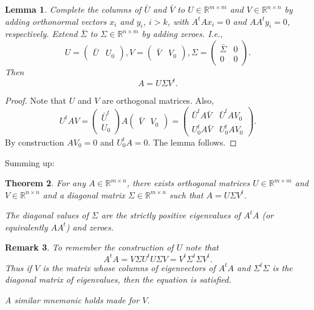 \documentclass{article}
\newtheorem{theorem}{Theorem}
\newtheorem{lemma}[theorem]{Lemma}
\newtheorem{remark}[theorem]{Remark}
\newcommand{\trans}{t}
\begin{document}
\begin{lemma}
Complete the columns of $\bar{U}$ and $\bar{V}$ to $U \in \mathbb{R}^{m \times m}$ and $V \in \mathbb{R}^{n \times n}$ by adding orthonormal vectors $x_i$ and $y_i$, $i > k$, with 
$A^\trans A x_i = 0$ and $AA^\trans y_i = 0$, respectively. Extend $\bar{\Sigma}$ to $\Sigma \in \mathbb{R}^{n \times m}$ by adding zeroes. I.e., 
\begin{equation}
U = \begin{pmatrix} \bar{U} &  U_0 \end{pmatrix}, 
V = \begin{pmatrix} \bar{V} & V_0 \end{pmatrix},
\Sigma = \begin{pmatrix} \bar{\Sigma} & 0 \\ 0 & 0 \end{pmatrix} .
\end{equation}
Then
\begin{equation}
A = U \Sigma V^\trans .
\end{equation}
\end{lemma}
\begin{proof}
Note that $U$ and $V$ are orthogonal matrices. Also,
\begin{equation}
U^\trans A V = \begin{pmatrix} \bar{U}^\trans \\ U_0 \end{pmatrix} A \begin{pmatrix} \bar{V} & V_0 \end{pmatrix} =
\begin{pmatrix} \bar{U}^\trans A \bar{V} & \bar{U}^\trans A V_0 \\  U_0^\trans A \bar{V} & U_0^\trans A V_0 \end{pmatrix} .
\end{equation}
By construction $A V_0 = 0$ and $U_0^\trans A = 0$. The lemma follows.
\end{proof}

Summing up:

\begin{theorem}
For any $A \in \mathbb{R}^{m \times n}$, there exists orthogonal matrices $U \in \mathbb{R}^{m \times m}$ and $V \in \mathbb{R}^{n \times n}$ and a diagonal matrix 
$\Sigma \in \mathbb{R}^{m \times n}$ such that $A = U \Sigma V^\trans$. 

The diagonal values of $\Sigma$ are the strictly positive eigenvalues of $A^\trans A$ (or equivalently $AA^\trans$) and zeroes.
\end{theorem}

\begin{remark}
To remember the construction of $U$ note that
\begin{equation}
A^\trans A = V \Sigma U^\trans U \Sigma V = V^\trans \Sigma^\trans \Sigma V^t .
\end{equation}
Thus if $V$ is the matrix whose columns of eigenvectors of $A^\trans A$ and $\Sigma^\trans \Sigma$ is the diagonal matrix of eigenvalues, then the equation is satisfied. 

A similar mnemonic holds made for $V$.
\end{remark}
\end{document}
